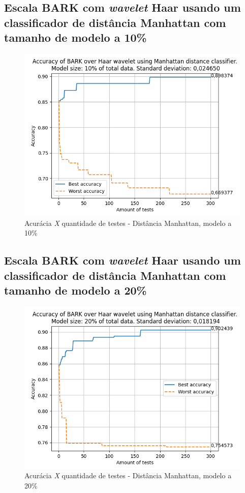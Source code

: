 		\newpage
		\subsection{Escala BARK com \textit{wavelet} Haar usando um classificador de distância Manhattan com tamanho de modelo a 10\%}
		\begin{figure}[ht]
			\centering
			\includegraphics{images/results/confusionMatrices/classifier_Manhattan_10.png}
			\caption{Acurácia \textit{X} quantidade de testes - Distância Manhattan, modelo a 10\%}
			\label{fig:classifiermanhattan10}
		\end{figure}
		
	
		\newpage
		\subsection{Escala BARK com \textit{wavelet} Haar usando um classificador de distância Manhattan com tamanho de modelo a 20\%}
		\begin{figure}[ht]
			\centering
			\includegraphics{images/results/confusionMatrices/classifier_Manhattan_20.png}
			\caption{Acurácia \textit{X} quantidade de testes - Distância Manhattan, modelo a 20\%}
			\label{fig:classifiermanhattan20}
		\end{figure}
		
	

